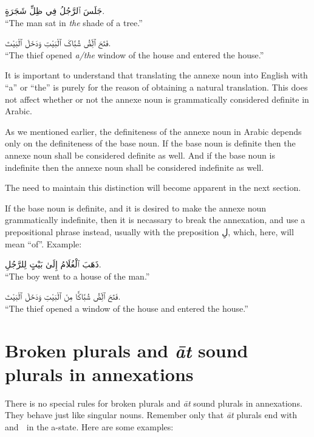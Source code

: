 \documentclass[
  10pt,
]{book}
\begin{document}
\foreignlanguage{arabic}{جَلَسَ ٱلرَّجُلُ فِي ظِلِّ شَجَرَةٍ.}\\
\enquote{The man sat in \emph{the} shade of a tree.}

\foreignlanguage{arabic}{فَتَحَ ٱلِّصُّ شُبَّاکَ ٱلْبَيْتِ وَدَخَلَ ٱلْبَيْتَ.}\\
\enquote{The thief opened \emph{a/the} window of the house and entered the house.}

It is important to understand that translating the annexe noun into English with \enquote{a} or \enquote{the} is purely for the reason of obtaining a natural translation. This does not affect whether or not the annexe noun is grammatically considered definite in Arabic.

As we mentioned earlier, the definiteness of the annexe noun in Arabic depends only on the definiteness of the base noun.
If the base noun is definite then the annexe noun shall be considered definite as well.
And if the base noun is indefinite then the annexe noun shall be considered indefinite as well.

The need to maintain this distinction will become apparent in the next section.

If the base noun is definite, and it is desired to make the annexe noun grammatically indefinite, then it is necassary to break the annexation, and use a prepositional phrase instead, usually with the preposition \foreignlanguage{arabic}{لِ}, which, here, will mean \enquote{of}. Example:

\foreignlanguage{arabic}{ذَهَبَ ٱلْغُلَامُ إِلَىٰ بَيْتٍ لِلرَّجُلِ.}\\
\enquote{The boy went to a house of the man.}

\foreignlanguage{arabic}{فَتَحَ ٱلِّصُّ شُبَّاکًّا مِنَ ٱلْبَيْتِ وَدَخَلَ ٱلْبَيْتَ.}\\
\enquote{The thief opened a window of the house and entered the house.}

\section{\texorpdfstring{Broken plurals and \emph{āt} sound plurals in annexations}{Broken plurals and āt sound plurals in annexations}}\label{broken-plurals-and-at-sound-plurals-in-annexations}

There is no special rules for broken plurals and \emph{āt} sound plurals in annexations. They behave just like singular nouns. Remember only that \emph{āt} plurals end with \emph{◌ٍ} and \foreignlanguage{arabic}{◌ِ} in the a-state. Here are some examples:
\end{document}
